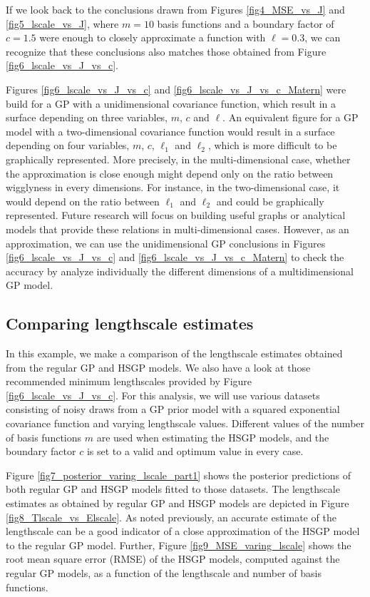 \documentclass[onecolumn,a4paper,11pt]{article}
\begin{document}
If we look back to the conclusions drawn from Figures \ref{fig4_MSE_vs_J} and \ref{fig5_lscale_vs_J}, where $m = 10$ basis functions and a boundary factor of $c = 1.5$ were enough to closely approximate a function with $\ell = 0.3$, we can recognize that these conclusions also matches those obtained from Figure \ref{fig6_lscale_vs_J_vs_c}.

Figures \ref{fig6_lscale_vs_J_vs_c} and \ref{fig6_lscale_vs_J_vs_c_Matern} were build for a GP with a unidimensional covariance function, which result in a surface depending on three variables, $m$, $c$ and $\ell$. An equivalent figure for a GP model with a two-dimensional covariance function would result in a surface depending on four variables, $m$, $c$, $\ell_1$ and $\ell_2$, which is more difficult to be graphically represented. More precisely, in the multi-dimensional case, whether the approximation is close enough might depend only on the ratio between wigglyness in every dimensions. For instance, in the two-dimensional case, it would depend on the ratio between $\ell_1$ and $\ell_2$ and could be graphically represented. Future research will focus on building useful graphs or analytical models that provide these relations in multi-dimensional cases. However, as an approximation, we can use the unidimensional GP conclusions in Figures \ref{fig6_lscale_vs_J_vs_c} and \ref{fig6_lscale_vs_J_vs_c_Matern} to check the accuracy by analyze individually the different dimensions of a multidimensional GP model.

\subsection{Comparing lengthscale estimates}

In this example, we make a comparison of the lengthscale estimates
obtained from the regular GP and HSGP models. We also have a look at those recommended minimum lengthscales provided by Figure \ref{fig6_lscale_vs_J_vs_c}.
For this analysis, we will use various datasets consisting of noisy draws from a GP prior model with a squared exponential covariance function and varying lengthscale values. Different values of the number of basis functions $m$ are used when estimating the HSGP models, and the boundary factor $c$ is set to a valid and optimum value in every case. 

Figure \ref{fig7_posterior_varing_lscale_part1} shows the posterior predictions of both regular GP and HSGP models fitted to those datasets. The lengthscale estimates as obtained by regular GP and HSGP models are depicted in Figure \ref{fig8_Tlscale_vs_Elscale}. As noted previously, an accurate estimate of the lengthscale can be a good indicator of a close approximation of the HSGP model to the regular GP model. Further, Figure \ref{fig9_MSE_varing_lscale} shows the root mean square error (RMSE) of the HSGP models, computed against the regular GP models, as a function of the lengthscale and number of basis functions.
\end{document}
